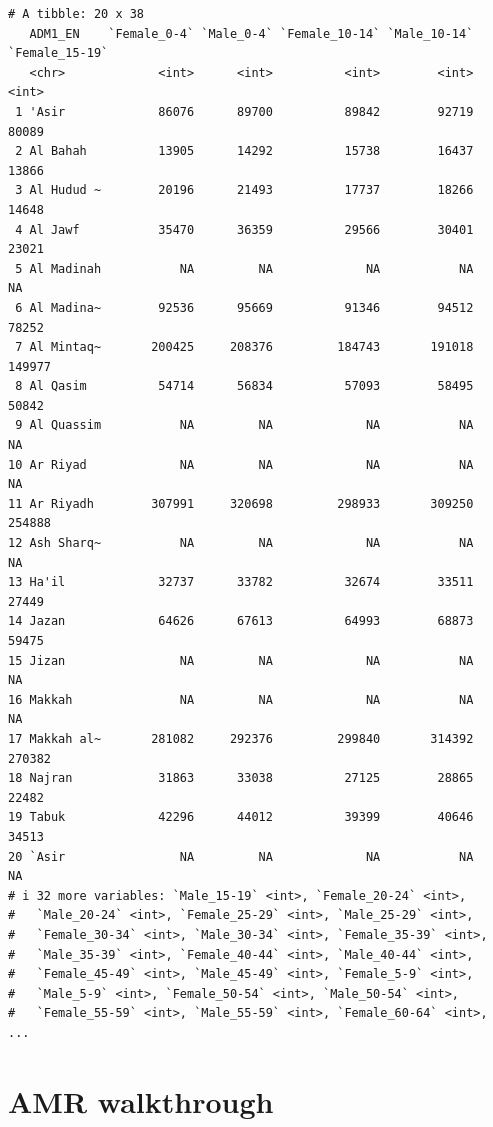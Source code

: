 \documentclass[
  letterpaper,
  DIV=11,
  numbers=noendperiod]{scrreprt}
\begin{document}
\begin{verbatim}
# A tibble: 20 x 38
   ADM1_EN    `Female_0-4` `Male_0-4` `Female_10-14` `Male_10-14` `Female_15-19`
   <chr>             <int>      <int>          <int>        <int>          <int>
 1 'Asir             86076      89700          89842        92719          80089
 2 Al Bahah          13905      14292          15738        16437          13866
 3 Al Hudud ~        20196      21493          17737        18266          14648
 4 Al Jawf           35470      36359          29566        30401          23021
 5 Al Madinah           NA         NA             NA           NA             NA
 6 Al Madina~        92536      95669          91346        94512          78252
 7 Al Mintaq~       200425     208376         184743       191018         149977
 8 Al Qasim          54714      56834          57093        58495          50842
 9 Al Quassim           NA         NA             NA           NA             NA
10 Ar Riyad             NA         NA             NA           NA             NA
11 Ar Riyadh        307991     320698         298933       309250         254888
12 Ash Sharq~           NA         NA             NA           NA             NA
13 Ha'il             32737      33782          32674        33511          27449
14 Jazan             64626      67613          64993        68873          59475
15 Jizan                NA         NA             NA           NA             NA
16 Makkah               NA         NA             NA           NA             NA
17 Makkah al~       281082     292376         299840       314392         270382
18 Najran            31863      33038          27125        28865          22482
19 Tabuk             42296      44012          39399        40646          34513
20 `Asir                NA         NA             NA           NA             NA
# i 32 more variables: `Male_15-19` <int>, `Female_20-24` <int>,
#   `Male_20-24` <int>, `Female_25-29` <int>, `Male_25-29` <int>,
#   `Female_30-34` <int>, `Male_30-34` <int>, `Female_35-39` <int>,
#   `Male_35-39` <int>, `Female_40-44` <int>, `Male_40-44` <int>,
#   `Female_45-49` <int>, `Male_45-49` <int>, `Female_5-9` <int>,
#   `Male_5-9` <int>, `Female_50-54` <int>, `Male_50-54` <int>,
#   `Female_55-59` <int>, `Male_55-59` <int>, `Female_60-64` <int>, ...
\end{verbatim}


\chapter{AMR walkthrough}\label{amr-walkthrough}
\end{document}
